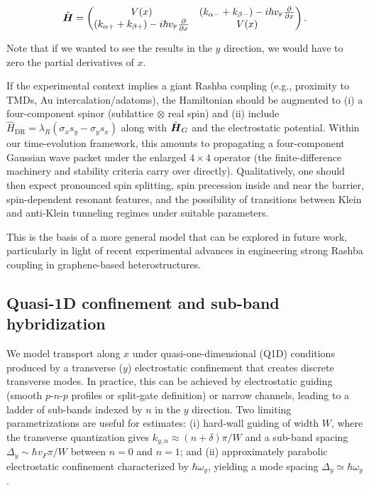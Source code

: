 \begin{equation}
    \label{eq:hybridHamiltonian}
    \hat{\mbox{\boldmath $H$}}=
    \begin{pmatrix}
        V(x) & \left(k_{\alpha-}+k_{\beta-}\right)-i\hbar v_{\mbox{\tiny F}}\frac{\partial}{\partial x} \\
        \left(k_{\alpha+}+k_{\beta+}\right)-i\hbar v_{\mbox{\tiny F}}\frac{\partial}{\partial x} & V(x)
    \end{pmatrix}.
\end{equation}

Note that if we wanted to see the results in the $y$ direction, we would have to zero the partial derivatives of $x$.

If the experimental context implies a giant Rashba coupling (e.g., proximity to TMDs, Au intercalation/adatoms), the Hamiltonian should be augmented to
(i) a four-component spinor (sublattice $\otimes$ real spin) and
(ii) include $\hat{H}_{\mathrm{DR}}=\lambda_R(\sigma_x s_y-\sigma_y s_x)$ along with $\hat{\mbox{\boldmath $H$}}_G$ and the electrostatic potential.
Within our time-evolution framework, this amounts to propagating a four-component Gaussian wave packet under the enlarged $4\times 4$ operator (the finite-difference machinery and stability criteria carry over directly).
Qualitatively, one should then expect pronounced spin splitting, spin precession inside and near the barrier, spin-dependent resonant features, and the possibility of transitions between Klein and anti-Klein tunneling regimes under suitable parameters\cite{DellAnnaJPhysCondMatt2018, AvsarNatCommun2014, WangPhysRevX2016}.

This is the basis of a more general model that can be explored in future work, particularly in light of recent experimental advances in engineering strong Rashba coupling in graphene-based heterostructures\cite{ManchonNatureMater2015}.

\subsection{Quasi-1D confinement and sub-band hybridization}\label{subsec:q1d-confinement-hybridization}
We model transport along $x$ under quasi-one-dimensional (Q1D) conditions produced by a transverse ($y$) electrostatic confinement that creates discrete transverse modes.
In practice, this can be achieved by electrostatic guiding (smooth $p$-$n$-$p$ profiles or split-gate definition) or narrow channels, leading to a ladder of sub-bands indexed by $n$ in the $y$ direction\cite{Young2009, ParedesPhysRevB2021, TrauzettelNature2007}.
Two limiting parametrizations are useful for estimates:
(i) hard-wall guiding of width $W$, where the transverse quantization gives $k_{y,n}\approx (n+\delta)\pi/W$ and a sub-band spacing $\Delta_y\sim \hbar v_F\pi/W$ between $n=0$ and $n=1$; and
(ii) approximately parabolic electrostatic confinement characterized by $\hbar\omega_y$, yielding a mode spacing $\Delta_y\simeq \hbar\omega_y$.

